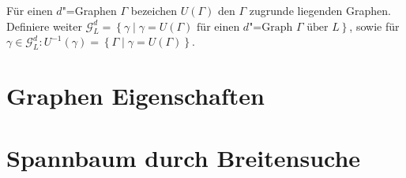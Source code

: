 \documentclass[11pt]{article}
\begin{document}
\begin{definition}
	Für einen $d$"=Graphen $\Gamma$ bezeichen $U\left(\Gamma\right)$ den $\Gamma$ zugrunde liegenden Graphen. 
	Definiere weiter $\mathcal{G}_L^d = \left\{\gamma \mid \gamma = U\left(\Gamma\right) \text{ für einen $d$"=Graph } \Gamma \text{ über } L\right\}$, sowie für $\gamma \in \mathcal{G}_L^d : U^{-1}\left(\gamma\right) = \left\{\Gamma \mid \gamma = U\left(\Gamma\right)\right\}$. 
\end{definition}
\section{Graphen Eigenschaften}

\section{Spannbaum durch Breitensuche}
\end{document}
